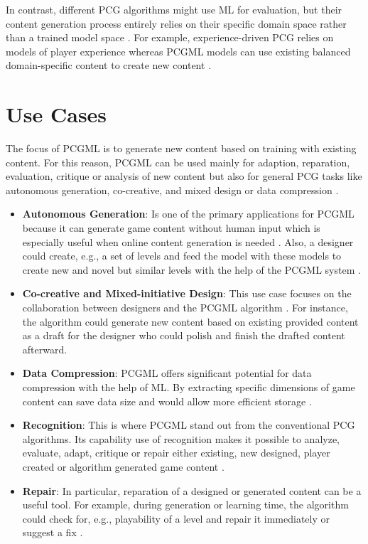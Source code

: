 \documentclass[MGS,Master,english]{twbook}%
\begin{document}
In contrast, different PCG algorithms might use ML for evaluation, but their content generation process entirely relies on their specific domain space rather than a trained model space \cite{pcgml::paper}. For example, experience-driven PCG relies on models of player experience whereas PCGML models can use existing balanced domain-specific content to create new content \cite{pcgml::paper}.

\section{Use Cases}
The focus of PCGML is to generate new content based on training with existing content. For this reason, PCGML can be used mainly for adaption, reparation, evaluation, critique or analysis of new content but also for general PCG tasks like autonomous generation, co-creative, and mixed design or data compression \cite{pcgml::paper}.
\begin{itemize}
	\item \textbf{Autonomous Generation}: Is one of the primary applications for PCGML because it can generate game content without human input which is especially useful when online content generation is needed \cite{pcgml::paper}. Also, a designer could create, e.g., a set of levels and feed the model with these models to create new and novel but similar levels with the help of the PCGML system \cite{pcgml::paper}.
	\item \textbf{Co-creative and Mixed-initiative Design}: This use case focuses on the collaboration between designers and the PCGML algorithm \cite{pcgml::paper}. For instance, the algorithm could generate new content based on existing provided content as a draft for the designer who could polish and finish the drafted content afterward.
	\item \textbf{Data Compression}: PCGML offers significant potential for data compression with the help of ML. By extracting specific dimensions of game content can save data size and would allow more efficient storage \cite{pcgml::paper}.
	\item \textbf{Recognition}: This is where PCGML stand out from the conventional PCG algorithms. Its capability use of recognition makes it possible to analyze, evaluate, adapt, critique or repair either existing, new designed, player created or algorithm generated game content \cite{pcgml::paper}. 
	\item \textbf{Repair}: In particular, reparation of a designed or generated content can be a useful tool. For example, during generation or learning time, the algorithm could check for, e.g., playability of a level and repair it immediately or suggest a fix \cite{pcgml::paper}.
\end{itemize}
\end{document}
